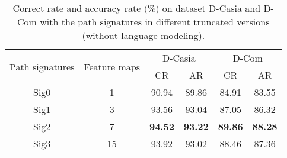 \documentclass[10pt,conference,a4paper]{IEEEtran}
\begin{document}
\begin{table}[t]
\caption{Correct rate and accuracy rate (\%) on dataset D-Casia and D-Com with the path signatures in different truncated versions (without language modeling).}
\label{TableSigResult}
\centering
\begin{tabular}{c|c|cc|cc}
\hline
\multirow{2}{*}{Path signatures}&\multirow{2}{*}{Feature maps}&\multicolumn{2}{c|}{D-Casia}&\multicolumn{2}{c}{D-Com}\\
\cline{3-6}
&&CR&AR&CR&AR\\
\hline
Sig0&1& 90.94& 89.86&84.91&83.55\\
Sig1&3& 93.56&93.04 &87.05&86.32\\
Sig2&7& \textbf{94.52}&\textbf{93.22} &\textbf{89.86} &\textbf{88.28}\\
Sig3&15& 93.92&93.02 &88.46&87.36\\
\hline
\end{tabular}
\end{table}
%
%
\end{document}
